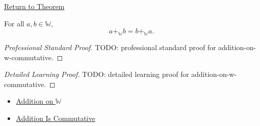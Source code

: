 \newpage
{}
\label{prf:addition-on-w-commutative}

\begin{remark*}[Return]
\hyperref[thm:addition-on-w-commutative]{Return to Theorem}
\end{remark*}

\begin{theorem*}
For all $a,b\in\mathbb{W}$,
\[
a+_{\mathbb{W}}b=b+_{\mathbb{W}}a.
\]
\end{theorem*}

\begin{proof}[Professional Standard Proof]
\LRAProofBodyStart
TODO: professional standard proof for addition-on-w-commutative.
\end{proof}

\begin{proof}[Detailed Learning Proof]
\LRAProofBodyStart
TODO: detailed learning proof for addition-on-w-commutative.
\end{proof}

\begin{remark*}
\end{remark*}

\begin{dependencies}
\begin{itemize}
  \item \hyperref[def:addition-on-w]{Addition on $\mathbb{W}$}
  \item \hyperref[thm:addition-commutative]{Addition Is Commutative}
\end{itemize}
\end{dependencies}

\clearpage
